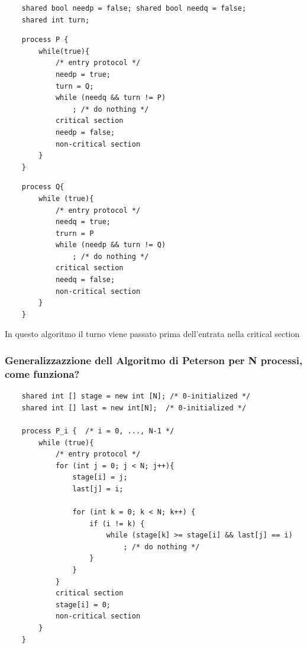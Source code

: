 \documentclass{article}
\begin{document}
\begin{verbatim}
    shared bool needp = false; shared bool needq = false;
    shared int turn;
\end{verbatim}
\vspace{0.25cm}
\noindent
\begin{minipage}[t]{0.48\textwidth}
    \begin{verbatim}
    process P {
        while(true){
            /* entry protocol */
            needp = true;
            turn = Q;
            while (needq && turn != P)
                ; /* do nothing */
            critical section
            needp = false;
            non-critical section
        }
    }
\end{verbatim}
\end{minipage}%
\hfill
\begin{minipage}[t]{0.48\textwidth}
    \begin{verbatim}
    process Q{
        while (true){
            /* entry protocol */
            needq = true;
            trurn = P
            while (needp && turn != Q)
                ; /* do nothing */
            critical section
            needq = false;
            non-critical section
        }
    }
\end{verbatim}
\end{minipage}

In questo algoritmo il turno viene passato prima dell'entrata nella critical
section

\subsubsection{Generalizzazzione dell Algoritmo di Peterson per N processi, come funziona?}
\begin{verbatim}
    shared int [] stage = new int [N]; /* 0-initialized */
    shared int [] last = new int[N];  /* 0-initialized */

    process P_i {  /* i = 0, ..., N-1 */
        while (true){
            /* entry protocol */
            for (int j = 0; j < N; j++){
                stage[i] = j;
                last[j] = i;

                for (int k = 0; k < N; k++) {
                    if (i != k) {
                        while (stage[k] >= stage[i] && last[j] == i)
                            ; /* do nothing */
                    }
                }
            }
            critical section
            stage[i] = 0;
            non-critical section
        }
    }
\end{verbatim}
\end{document}
